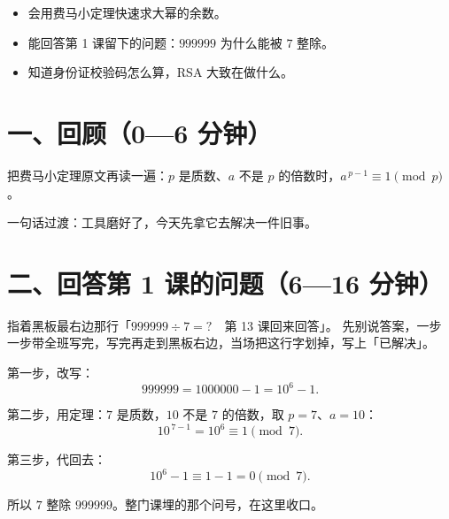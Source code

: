 

\begin{mubiao}
  \begin{itemize}
    \item 会用费马小定理快速求大幂的余数。
    \item 能回答第 1 课留下的问题：\(999999\) 为什么能被 \(7\) 整除。
    \item 知道身份证校验码怎么算，RSA 大致在做什么。
  \end{itemize}
\end{mubiao}


\section*{一、回顾（0—6 分钟）}

把费马小定理原文再读一遍：\(p\) 是质数、\(a\) 不是 \(p\) 的倍数时，\(a^{\,p-1}\equiv1\pmod p\)。

一句话过渡：工具磨好了，今天先拿它去解决一件旧事。

\section*{二、回答第 1 课的问题（6—16 分钟）}

\begin{caozuo}
  指着黑板最右边那行「\(999999\div7=?\)　第 13 课回来回答」。
  先别说答案，一步一步带全班写完，写完再走到黑板右边，当场把这行字划掉，写上「已解决」。
\end{caozuo}

第一步，改写：
\[
  999999=1000000-1=10^{6}-1 .
\]

第二步，用定理：\(7\) 是质数，\(10\) 不是 \(7\) 的倍数，取 \(p=7\)、\(a=10\)：
\[
  10^{\,7-1}=10^{6}\equiv1\pmod 7 .
\]

第三步，代回去：
\[
  10^{6}-1\equiv1-1=0\pmod 7 .
\]

所以 \(7\) 整除 \(999999\)。整门课埋的那个问号，在这里收口。

